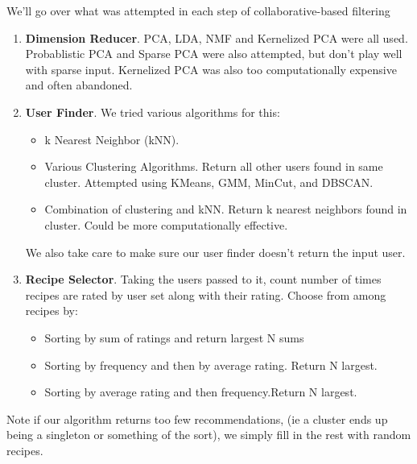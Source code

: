 \documentclass[11pt]{article}
\begin{document}
We'll go over what was attempted in each step of collaborative-based filtering
\begin{enumerate}
    \item \textbf{Dimension Reducer}. PCA, LDA, NMF and Kernelized PCA were all used. Probablistic PCA and Sparse PCA were also attempted, but don't play well with sparse input. Kernelized PCA was also too computationally expensive and often abandoned.
    \item \textbf{User Finder}. We tried various algorithms for this:
    \begin{itemize}
        \item k Nearest Neighbor (kNN).
        \item Various Clustering Algorithms. Return all other users found in same cluster. Attempted using KMeans, GMM, MinCut, and DBSCAN.
        \item Combination of clustering and kNN. Return k nearest neighbors found in cluster. Could be more computationally effective.
    \end{itemize}
    We also take care to make sure our user finder doesn't return the input user.
    \item \textbf{Recipe Selector}. Taking the users passed to it, count number of times recipes are rated by user set along with their rating. Choose from among recipes by:
    \begin{itemize}
        \item Sorting by sum of ratings and return largest N sums
        \item Sorting by frequency and then by average rating. Return N largest.
        \item Sorting by average rating and then frequency.Return N largest.
    \end{itemize}
\end{enumerate}

Note if our algorithm returns too few recommendations, (ie a cluster ends up being a singleton or something of the sort), we simply fill in the rest with random recipes. 
\end{document}
